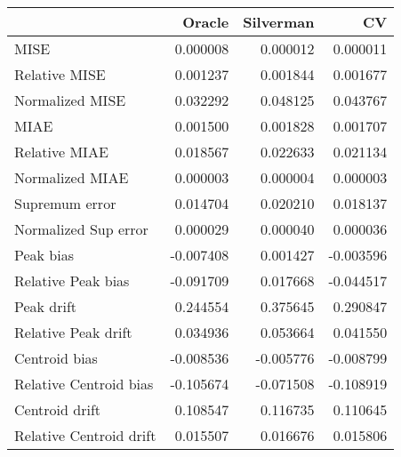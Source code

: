 \begin{tabular}{lrrr}
  \toprule
 & Oracle & Silverman & CV \\ 
  \midrule
MISE & 0.000008 & 0.000012 & 0.000011 \\ 
  Relative MISE & 0.001237 & 0.001844 & 0.001677 \\ 
  Normalized MISE & 0.032292 & 0.048125 & 0.043767 \\ 
  MIAE & 0.001500 & 0.001828 & 0.001707 \\ 
  Relative MIAE & 0.018567 & 0.022633 & 0.021134 \\ 
  Normalized MIAE & 0.000003 & 0.000004 & 0.000003 \\ 
  Supremum error & 0.014704 & 0.020210 & 0.018137 \\ 
  Normalized Sup error & 0.000029 & 0.000040 & 0.000036 \\ 
  Peak bias & -0.007408 & 0.001427 & -0.003596 \\ 
  Relative Peak bias & -0.091709 & 0.017668 & -0.044517 \\ 
  Peak drift & 0.244554 & 0.375645 & 0.290847 \\ 
  Relative Peak drift & 0.034936 & 0.053664 & 0.041550 \\ 
  Centroid bias & -0.008536 & -0.005776 & -0.008799 \\ 
  Relative Centroid bias & -0.105674 & -0.071508 & -0.108919 \\ 
  Centroid drift & 0.108547 & 0.116735 & 0.110645 \\ 
  Relative Centroid drift & 0.015507 & 0.016676 & 0.015806 \\ 
   \bottomrule
\end{tabular}
